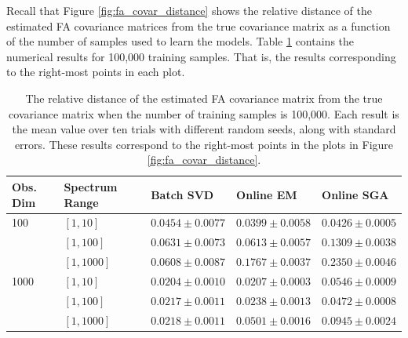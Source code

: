 \documentclass[msc,deptreport.inf]{infthesis} %
\begin{document}
Recall that Figure \ref{fig:fa_covar_distance} shows the relative distance of the estimated FA covariance matrices from the true covariance matrix as a function of the number of samples used to learn the models. Table \ref{table:fa_covar_distance} contains the numerical results for 100,000 training samples. That is, the results corresponding to the right-most points in each plot.
\begin{table}[h!]
	\begin{center}
		\begin{tabular}{@{} lllll @{}} 
 			\toprule
 			Obs. Dim & Spectrum Range & Batch SVD & Online EM & Online SGA \\ 
 			\midrule
			100 	& $[1, 10]$ 	& $\mathbf{0.0454 \pm 0.0077}$ & $\mathbf{0.0399 \pm 0.0058}$	& $\mathbf{0.0426 \pm 0.0005}$ \\ 
				& $[1, 100]$ 	& $\mathbf{0.0631 \pm 0.0073}$ & $\mathbf{0.0613 \pm 0.0057}$ 	& $0.1309 \pm 0.0038$ \\ 
				& $[1, 1000]$	& $\mathbf{0.0608 \pm 0.0087}$ & $0.1767 \pm 0.0037$ 			& $0.2350 \pm 0.0046$ \\ 
			\midrule
			1000	& $[1, 10]$ 	& $\mathbf{0.0204 \pm 0.0010}$ & $\mathbf{0.0207 \pm 0.0003}$ 	& $0.0546 \pm 0.0009$ \\ 
				& $[1, 100]$ 	& $\mathbf{0.0217 \pm 0.0011}$ & $\mathbf{0.0238 \pm 0.0013}$ 	& $0.0472 \pm 0.0008$ \\ 
				& $[1, 1000]$ 	& $\mathbf{0.0218 \pm 0.0011}$ & $0.0501 \pm 0.0016$ 			& $0.0945 \pm 0.0024$ \\
			\bottomrule
		\end{tabular}
		\caption{The relative distance of the estimated FA covariance matrix from the true covariance matrix when 
		the number of training samples is 100,000. Each result is the mean value over ten trials with different random seeds, along with standard errors. These results correspond to the right-most points in the plots in Figure \ref{fig:fa_covar_distance}.}
		\label{table:fa_covar_distance}
	\end{center}
\end{table}
\end{document}
